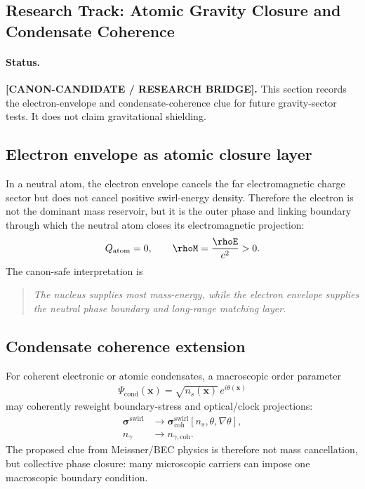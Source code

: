 \subsection{Research Track: Atomic Gravity Closure and Condensate Coherence}
\label{sec:rt_atomic_gravity_closure_condensate}

\paragraph{Status.}
\textbf{[CANON-CANDIDATE / RESEARCH BRIDGE].}
This section records the electron-envelope and condensate-coherence clue for
future gravity-sector tests. It does not claim gravitational shielding.

\subsection{Electron envelope as atomic closure layer}

In a neutral atom, the electron envelope cancels the far electromagnetic charge
sector but does not cancel positive swirl-energy density. Therefore the electron
is not the dominant mass reservoir, but it is the outer phase and linking
boundary through which the neutral atom closes its electromagnetic projection:
\begin{align}
    Q_{\mathrm{atom}}=0,
    \qquad
    \rhoM
    =
    \frac{\rhoE}{c^2}
    >0.
    \label{eq:rt_atomic_charge_mass_split}
\end{align}
The canon-safe interpretation is
\begin{quote}
\textit{
The nucleus supplies most mass-energy, while the electron envelope supplies
the neutral phase boundary and long-range matching layer.}
\end{quote}

\subsection{Condensate coherence extension}

For coherent electronic or atomic condensates, a macroscopic order parameter
\begin{align}
    \Psi_{\mathrm{cond}}(\mathbf{x})
    =
    \sqrt{n_s(\mathbf{x})}\,e^{i\theta(\mathbf{x})}
    \label{eq:rt_condensate_order_parameter}
\end{align}
may coherently reweight boundary-stress and optical/clock projections:
\begin{align}
    \boldsymbol{\sigma}^{\mathrm{swirl}}
    &\rightarrow
    \boldsymbol{\sigma}^{\mathrm{swirl}}_{\mathrm{coh}}[n_s,\theta,\nabla\theta],
    \\
    n_\gamma
    &\rightarrow
    n_{\gamma,\mathrm{coh}}.
    \label{eq:rt_condensate_projection_reweighting}
\end{align}
The proposed clue from Meissner/BEC physics is therefore not mass cancellation,
but collective phase closure: many microscopic carriers can impose one
macroscopic boundary condition.

